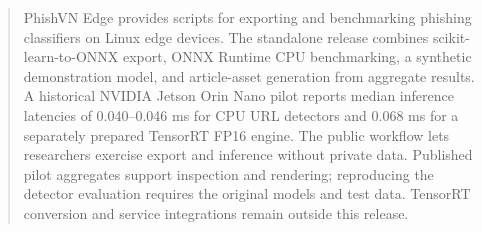 \begin{abstract}
PhishVN Edge provides scripts for exporting and benchmarking phishing classifiers on Linux edge devices. The standalone release combines scikit-learn-to-ONNX export, ONNX Runtime CPU benchmarking, a synthetic demonstration model, and article-asset generation from aggregate results. A historical NVIDIA Jetson Orin Nano pilot reports median inference latencies of 0.040--0.046 ms for CPU URL detectors and 0.068 ms for a separately prepared TensorRT FP16 engine. The public workflow lets researchers exercise export and inference without private data. Published pilot aggregates support inspection and rendering; reproducing the detector evaluation requires the original models and test data. TensorRT conversion and service integrations remain outside this release.
\end{abstract}
